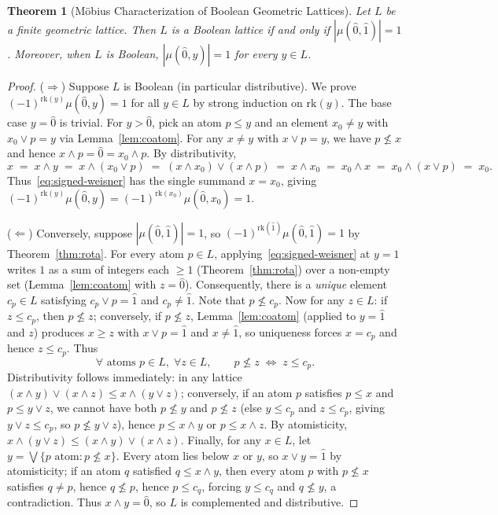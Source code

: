 \documentclass[11pt]{article}
\newtheorem{theorem}{Theorem}[section]
\theoremstyle{definition}
\theoremstyle{remark}
\newcommand{\rk}{\mathrm{rk}}
\newcommand{\hatzero}{\hat{0}}
\newcommand{\hatone}{\hat{1}}
\begin{document}
\begin{theorem}[M\"obius Characterization of Boolean Geometric Lattices]
\label{thm:bool-char}
Let $L$ be a finite geometric lattice. Then $L$ is a Boolean lattice if and only if $|\mu(\hatzero, \hatone)| = 1$. Moreover, when $L$ is Boolean, $|\mu(\hatzero, y)| = 1$ for every $y \in L$.
\end{theorem}

\begin{proof}
($\Rightarrow$) Suppose $L$ is Boolean (in particular distributive). We prove $(-1)^{\rk(y)} \mu(\hatzero, y) = 1$ for all $y \in L$ by strong induction on $\rk(y)$. The base case $y = \hatzero$ is trivial. For $y > \hatzero$, pick an atom $p \le y$ and an element $x_0 \neq y$ with $x_0 \vee p = y$ via Lemma~\ref{lem:coatom}. For any $x \neq y$ with $x \vee p = y$, we have $p \not\le x$ and hence $x \wedge p = \hatzero = x_0 \wedge p$. By distributivity,
\[
  x \;=\; x \wedge y \;=\; x \wedge (x_0 \vee p) \;=\; (x \wedge x_0) \vee (x \wedge p) \;=\; x \wedge x_0 \;=\; x_0 \wedge x \;=\; x_0 \wedge (x \vee p) \;=\; x_0.
\]
Thus~\eqref{eq:signed-weisner} has the single summand $x = x_0$, giving $(-1)^{\rk(y)} \mu(\hatzero, y) = (-1)^{\rk(x_0)} \mu(\hatzero, x_0) = 1$.

($\Leftarrow$) Conversely, suppose $|\mu(\hatzero, \hatone)| = 1$, so $(-1)^{\rk(\hatone)} \mu(\hatzero, \hatone) = 1$ by Theorem~\ref{thm:rota}. For every atom $p \in L$, applying~\eqref{eq:signed-weisner} at $y = \hatone$ writes $1$ as a sum of integers each $\ge 1$ (Theorem~\ref{thm:rota}) over a non-empty set (Lemma~\ref{lem:coatom} with $z = \hatzero$). Consequently, there is a \emph{unique} element $c_p \in L$ satisfying $c_p \vee p = \hatone$ and $c_p \neq \hatone$. Note that $p \not\le c_p$. Now for any $z \in L$: if $z \le c_p$, then $p \not\le z$; conversely, if $p \not\le z$, Lemma~\ref{lem:coatom} (applied to $y = \hatone$ and $z$) produces $x \ge z$ with $x \vee p = \hatone$ and $x \neq \hatone$, so uniqueness forces $x = c_p$ and hence $z \le c_p$. Thus
\[
  \forall \text{ atoms } p \in L,\; \forall z \in L, \qquad p \not\le z \;\Longleftrightarrow\; z \le c_p.
\]
Distributivity follows immediately: in any lattice $(x \wedge y) \vee (x \wedge z) \le x \wedge (y \vee z)$; conversely, if an atom $p$ satisfies $p \le x$ and $p \le y \vee z$, we cannot have both $p \not\le y$ and $p \not\le z$ (else $y \le c_p$ and $z \le c_p$, giving $y \vee z \le c_p$, so $p \not\le y \vee z$), hence $p \le x \wedge y$ or $p \le x \wedge z$. By atomisticity, $x \wedge (y \vee z) \le (x \wedge y) \vee (x \wedge z)$. Finally, for any $x \in L$, let $y = \bigvee \{p \text{ atom} : p \not\le x\}$. Every atom lies below $x$ or $y$, so $x \vee y = \hatone$ by atomisticity; if an atom $q$ satisfied $q \le x \wedge y$, then every atom $p$ with $p \not\le x$ satisfies $q \neq p$, hence $q \not\le p$, hence $p \le c_q$, forcing $y \le c_q$ and $q \not\le y$, a contradiction. Thus $x \wedge y = \hatzero$, so $L$ is complemented and distributive.
\end{proof}
\end{document}
